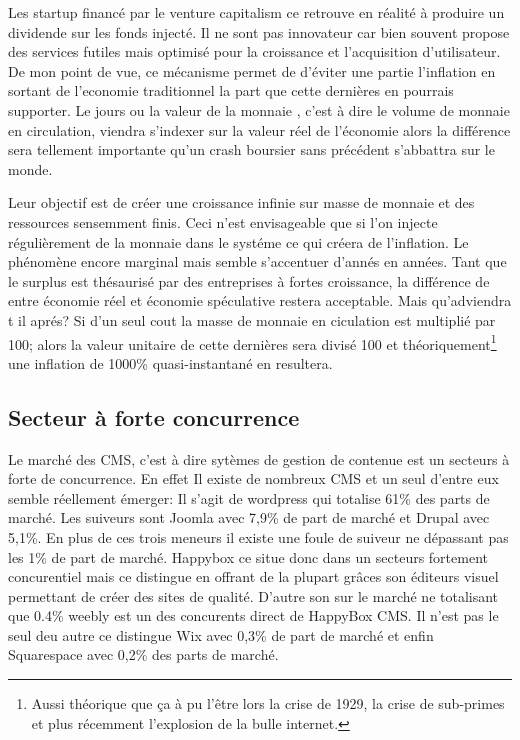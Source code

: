 \documentclass[11pt, a4paper ]{article}
\begin{document}
\begin{spacing}{1.5}
Les startup financé par le venture capitalism ce retrouve en réalité à produire un dividende sur les fonds injecté. Il ne sont pas innovateur car bien souvent propose des services futiles mais optimisé pour la croissance et l'acquisition d'utilisateur.
De mon point de vue, ce mécanisme permet de d'éviter une partie l'inflation en sortant de l'economie traditionnel la part que cette dernières en pourrais supporter. Le jours ou la valeur de la monnaie , c'est à dire le volume de monnaie en circulation, viendra s'indexer sur la valeur réel de l'économie alors la différence sera tellement importante qu'un crash boursier sans précédent s'abbattra sur le monde.

Leur objectif est de créer une croissance infinie sur masse de monnaie et des ressources sensemment finis. Ceci n'est envisageable que si l'on injecte régulièrement de la monnaie dans le systéme ce qui créera de l'inflation. Le phénomène encore marginal mais semble s'accentuer d'annés en années. Tant que le surplus est thésaurisé par des entreprises à fortes croissance, la différence de entre économie réel et économie spéculative restera acceptable.
Mais qu'adviendra t il aprés? Si d'un seul cout la masse de monnaie en ciculation est multiplié par 100; alors la valeur unitaire de cette dernières sera divisé 100 et théoriquement\footnote{Aussi théorique que ça à pu l'être lors la crise de 1929, la crise de sub-primes et plus récemment l'explosion de la bulle internet.} une inflation de 1000\% quasi-instantané en resultera.




\subsection{Secteur à forte concurrence}
Le marché des CMS, c'est à dire sytèmes de gestion de contenue est un secteurs à forte de concurrence. En effet Il existe de nombreux CMS et un seul d'entre eux semble réellement émerger: Il s'agit de wordpress qui totalise 61\% des parts de marché\cite{cms}. Les suiveurs sont Joomla avec 7,9\% de part de marché et Drupal avec 5,1\%. 
En plus de ces trois meneurs il existe une foule de suiveur ne dépassant pas les 1\% de part de marché.
Happybox ce situe donc dans un secteurs fortement concurentiel mais ce distingue en offrant de la plupart grâces son éditeurs visuel permettant de créer des sites de qualité. D'autre son sur le marché ne totalisant que 0.4\% weebly est un des concurents direct de HappyBox CMS. Il n'est pas le seul deu autre ce distingue Wix avec 0,3\% de part de marché et enfin Squarespace avec 0,2\% des parts de marché.


\end{spacing}
\end{document}
